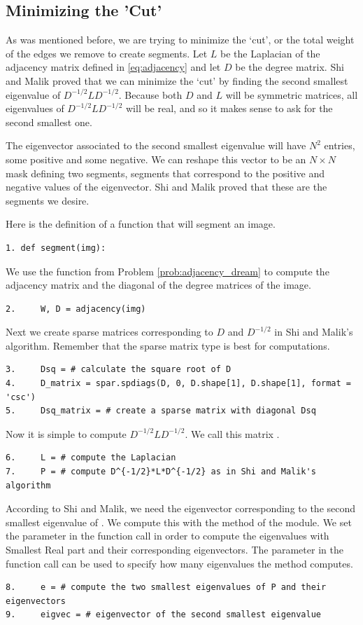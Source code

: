\subsection*{Minimizing the 'Cut'}

As was mentioned before, we are trying to minimize the `cut', or the total weight of the edges we remove to create segments. 
Let $L$ be the Laplacian of the adjacency matrix defined in \ref{eq:adjacency} and let $D$ be the degree matrix.
Shi and Malik proved that we can minimize the `cut' by finding the second smallest eigenvalue of $D^{-1/2}LD^{-1/2}$.
Because both $D$ and $L$ will be symmetric matrices, all eigenvalues of $D^{-1/2}LD^{-1/2}$ will be real, and so it makes sense to ask for the second smallest one.

The eigenvector associated to the second smallest eigenvalue will have $N^2$ entries, some positive and some negative. 
We can reshape this vector to be an $N \times N$ mask defining two segments, segments that correspond to the positive and negative values of the eigenvector.
Shi and Malik proved that these are the segments we desire. 

Here is the definition of a function that will segment an image.
\begin{lstlisting}
1. def segment(img):
\end{lstlisting}

We use the function  from Problem \ref{prob:adjacency_dream} to compute the adjacency matrix and the diagonal of the degree matrices of the image. 
\begin{lstlisting}
2.     W, D = adjacency(img)
\end{lstlisting}

Next we create sparse matrices corresponding to $D$ and $D^{-1/2}$ in Shi and Malik's algorithm. Remember that the sparse matrix type  is best for computations.
\begin{lstlisting}
3.     Dsq = # calculate the square root of D
4.     D_matrix = spar.spdiags(D, 0, D.shape[1], D.shape[1], format = 'csc')
5.     Dsq_matrix = # create a sparse matrix with diagonal Dsq
\end{lstlisting}
Now it is simple to compute $D^{-1/2}LD^{-1/2}$. We call this matrix .
\begin{lstlisting}
6.     L = # compute the Laplacian
7.     P = # compute D^{-1/2}*L*D^{-1/2} as in Shi and Malik's algorithm
\end{lstlisting}
According to Shi and Malik, we need the eigenvector corresponding to the second smallest eigenvalue of . We compute this with the  method of the  module. We set the parameter  in the function call in order to compute the eigenvalues with Smallest Real part and their corresponding eigenvectors. The parameter  in the function call can be used to specify how many eigenvalues the method computes.
\begin{lstlisting}
8.     e = # compute the two smallest eigenvalues of P and their eigenvectors
9.     eigvec = # eigenvector of the second smallest eigenvalue
\end{lstlisting}

